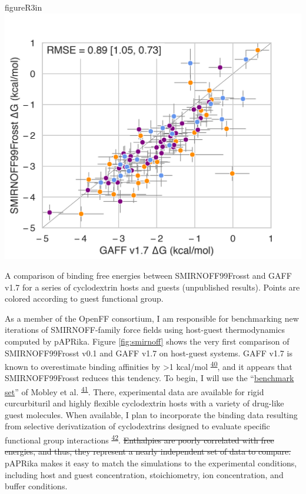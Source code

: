 \documentclass[11pt,notitlepage]{article}
\providecommand{\DIFdeltex}[1]{{\protect\color{red}\sout{#1}}}                      %
\providecommand{\DIFaddbegin}{} %
\providecommand{\DIFaddend}{} %
\providecommand{\DIFdelbegin}{} %
\providecommand{\DIFdelend}{} %
\providecommand{\DIFdel}[1]{\texorpdfstring{\DIFdeltex{#1}}{}} %
\newcommand{\DIFscaledelfig}{0.5}
\newlength{\DIFdelgraphicswidth} %
\newlength{\DIFdelgraphicsheight} %
\newcommand{\DIFaddincludegraphics}[2][]{{\color{blue}\fbox{\DIFOincludegraphics[#1]{#2}}}} %
\newcommand{\DIFdelincludegraphics}[2][]{%
\sbox{\DIFdelgraphicsbox}{\DIFOincludegraphics[#1]{#2}}%
\settoboxwidth{\DIFdelgraphicswidth}{\DIFdelgraphicsbox} %
\settoboxtotalheight{\DIFdelgraphicsheight}{\DIFdelgraphicsbox} %
\scalebox{\DIFscaledelfig}{%
\parbox[b]{\DIFdelgraphicswidth}{\usebox{\DIFdelgraphicsbox}\\[-\baselineskip] \rule{\DIFdelgraphicswidth}{0em}}\llap{\resizebox{\DIFdelgraphicswidth}{\DIFdelgraphicsheight}{%
\setlength{\unitlength}{\DIFdelgraphicswidth}%
\begin{picture}(1,1)%
\thicklines\linethickness{2pt} %
{\color[rgb]{1,0,0}\put(0,0){\framebox(1,1){}}}%
{\color[rgb]{1,0,0}\put(0,0){\line( 1,1){1}}}%
{\color[rgb]{1,0,0}\put(0,1){\line(1,-1){1}}}%
\end{picture}%
}\hspace*{3pt}}} %
} %
\DeclareRobustCommand{\DIFaddbegin}{\DIFOaddbegin \let\includegraphics\DIFaddincludegraphics} %
\DeclareRobustCommand{\DIFaddend}{\DIFOaddend \let\includegraphics\DIFOincludegraphics} %
\DeclareRobustCommand{\DIFdelbegin}{\DIFOdelbegin \let\includegraphics\DIFdelincludegraphics} %
\DeclareRobustCommand{\DIFdelend}{\DIFOaddend \let\includegraphics\DIFOincludegraphics} %
\begin{document}
\begin{wrapfloat}{figure}{R}{3in}
\centering
\includegraphics{content/images/SMIRNOFF-vs-GAFF-deltaG.png}
\caption{A comparison of binding free energies between SMIRNOFF99Frosst
and GAFF v1.7 for a series of cyclodextrin hosts and guests (unpublished
results). Points are colored according to guest functional group.}
\label{fig:smirnoff}
\end{wrapfloat}

As a member of the OpenFF consortium, I am responsible for benchmarking
new iterations of SMIRNOFF-family force fields using host-guest
thermodynamics computed by pAPRika. Figure \ref{fig:smirnoff} shows the
very first comparison of SMIRNOFF99Frosst v0.1 and GAFF v1.7 on
host-guest systems. GAFF v1.7 is known to overestimate binding
affinities by \textgreater{}1
kcal/mol\textsuperscript{\protect\DIFdelbegin %
\DIFdelend \DIFaddbegin \hyperlink{ref-HVgz5rZq}{40}\DIFaddend }, and it
appears that SMIRNOFF99Frosst reduces this tendency. To begin, I will
use the ``\href{https://escholarship.org/uc/item/9p37m6bq}{benchmark
set}'' of Mobley et
al.\textsuperscript{\protect\DIFdelbegin %
\DIFdelend \DIFaddbegin \hyperlink{ref-12BD3oHp4}{41}\DIFaddend }. There,
experimental data are available for rigid curcurbituril and highly
flexible cyclodextrin hosts with a variety of drug-like guest molecules.
When available, I plan to incorporate the binding data resulting from
selective derivatization of cyclodextrins designed to evaluate specific
functional group
interactions\textsuperscript{\protect\DIFdelbegin %
\DIFdelend \DIFaddbegin \hyperlink{ref-13gqBX78S}{42}\DIFaddend }.
\DIFdelbegin \DIFdel{Enthalpies are poorly correlated with free energies, and thus, they
represent a nearly independent set of data to compare. }\DIFdelend pAPRika makes it easy to match the simulations to the experimental
conditions, including host and guest concentration, stoichiometry, ion
concentration, and buffer conditions.
\end{document}
